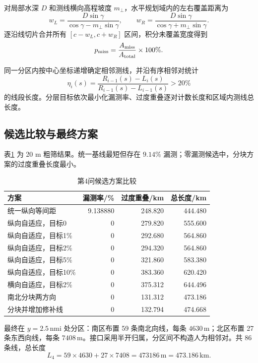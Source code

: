\documentclass[UTF8,a4paper,12pt]{ctexart}
\newcommand{\nmi}{\,\mathrm{nmi}}
\newcommand{\m}{\,\mathrm{m}}
\newcommand{\km}{\,\mathrm{km}}
\begin{document}
对局部水深 $D$ 和测线横向高程坡度 $m_\perp$，水平规划域内的左右覆盖距离为
\begin{equation}
w_L=\frac{D\sin\gamma}{\cos\gamma-m_\perp\sin\gamma},\qquad
w_R=\frac{D\sin\gamma}{\cos\gamma+m_\perp\sin\gamma}.
\end{equation}
逐沿线切片合并所有 $[c-w_L,c+w_R]$ 区间，积分未覆盖宽度得到
\begin{equation}
p_{\rm miss}=\frac{A_{\rm miss}}{A_{\rm total}}\times100\%.
\end{equation}

同一分区内按中心坐标递增确定相邻测线，并沿有序相邻对统计
\begin{equation}
\eta_i(s)=\frac{R_{i-1}(s)-L_i(s)}{R_{i-1}(s)-L_{i-1}(s)}>20\%
\end{equation}
的线段长度。分层目标依次最小化漏测率、过度重叠逐对计数长度和区域内测线总长度。

\subsection{候选比较与最终方案}

表\ref{tab:q4candidates} 为 20 m 粗筛结果。统一基线最短但存在 $9.14\%$ 漏测；零漏测候选中，分块方案的过度重叠长度最小。

\begin{table}[H]
\centering
\caption{第4问候选方案比较}
\label{tab:q4candidates}
\begin{tabular}{lrrr}
\toprule
方案 & 漏测率/\% & 过度重叠/km & 总长度/km\\
\midrule
统一纵向等间距 & 9.138880 & 248.820 & 444.480\\
纵向自适应，目标0 & 0 & 279.820 & 555.600\\
纵向自适应，目标1\% & 0 & 292.680 & 564.860\\
纵向自适应，目标2\% & 0 & 294.320 & 564.860\\
纵向自适应，目标5\% & 0 & 321.860 & 583.380\\
纵向自适应，目标10\% & 0 & 383.360 & 620.420\\
横向自适应，目标2\% & 0 & 375.312 & 644.496\\
南北分块两方向 & 0 & 131.312 & 473.186\\
分块并增加修补线 & 0 & 132.794 & 474.668\\
\bottomrule
\end{tabular}
\end{table}

最终在 $y=2.5\nmi$ 处分区：南区布置 59 条南北向线，每条 $4630\m$；北区布置 27 条东西向线，每条 $7408\m$。接口采用半开归属，分区间不构造人为相邻对。共 86 条线，总长度
\begin{equation}
L_4=59\times4630+27\times7408=473186\m=473.186\km.
\end{equation}
\end{document}
